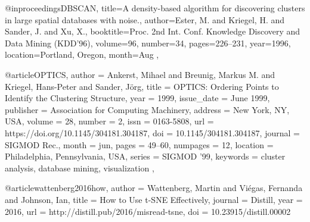 @inproceedings{DBSCAN,
  title={A density-based algorithm for discovering clusters in large spatial databases with noise.},
  author={Ester, M. and Kriegel, H. and Sander, J. and Xu, X.},
  booktitle={Proc. 2nd Int. Conf. Knowledge Discovery and Data Mining (KDD’96)},
  volume={96},
  number={34},
  pages={226--231},
  year={1996},
  location={Portland, Oregon},
  month={Aug}
},

@article{OPTICS,
  author = {Ankerst, Mihael and Breunig, Markus M. and Kriegel, Hans-Peter and Sander, J\"{o}rg},
  title = {OPTICS: Ordering Points to Identify the Clustering Structure},
  year = {1999},
  issue_date = {June 1999},
  publisher = {Association for Computing Machinery},
  address = {New York, NY, USA},
  volume = {28},
  number = {2},
  issn = {0163-5808},
  url = {https://doi.org/10.1145/304181.304187},
  doi = {10.1145/304181.304187},
  journal = {SIGMOD Rec.},
  month = jun,
  pages = {49–60},
  numpages = {12},
  location = {Philadelphia, Pennsylvania, USA},
  series = {SIGMOD ’99},
  keywords = {cluster analysis, database mining, visualization}
},
  
@article{wattenberg2016how,
  author = {Wattenberg, Martin and Viégas, Fernanda and Johnson, Ian},
  title = {How to Use t-SNE Effectively},
  journal = {Distill},
  year = {2016},
  url = {http://distill.pub/2016/misread-tsne},
  doi = {10.23915/distill.00002}
}

